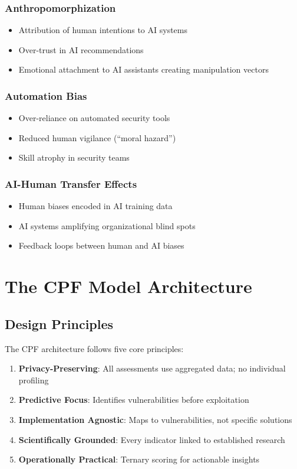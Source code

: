 \documentclass[11pt,a4paper]{article}
\begin{document}
\subsubsection{Anthropomorphization}
\begin{itemize}
\item Attribution of human intentions to AI systems
\item Over-trust in AI recommendations
\item Emotional attachment to AI assistants creating manipulation vectors
\end{itemize}

\subsubsection{Automation Bias}
\begin{itemize}
\item Over-reliance on automated security tools
\item Reduced human vigilance (``moral hazard'')
\item Skill atrophy in security teams
\end{itemize}

\subsubsection{AI-Human Transfer Effects}
\begin{itemize}
\item Human biases encoded in AI training data
\item AI systems amplifying organizational blind spots
\item Feedback loops between human and AI biases
\end{itemize}

\section{The CPF Model Architecture}

\subsection{Design Principles}

The CPF architecture follows five core principles:
\begin{enumerate}
\item \textbf{Privacy-Preserving}: All assessments use aggregated data; no individual profiling
\item \textbf{Predictive Focus}: Identifies vulnerabilities before exploitation
\item \textbf{Implementation Agnostic}: Maps to vulnerabilities, not specific solutions
\item \textbf{Scientifically Grounded}: Every indicator linked to established research
\item \textbf{Operationally Practical}: Ternary scoring for actionable insights
\end{enumerate}
\end{document}
